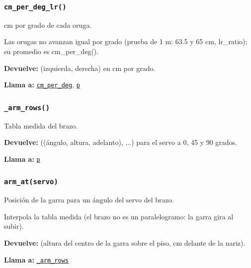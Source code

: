 \subsubsection{\texttt{cm\_\allowbreak{}per\_\allowbreak{}deg\_\allowbreak{}lr()}}\label{fn:geometry:cm-per-deg-lr}
\noindent cm por grado de cada oruga.

Las orugas no avanzan igual por grado (prueba de 1 m: 63.5 y 65 cm, lr\_ratio); su promedio es cm\_per\_deg().

\noindent\textbf{Devuelve:} (izquierda, derecha) en cm por grado.\par
\noindent\textbf{Llama a:} \hyperref[fn:geometry:cm-per-deg]{\texttt{cm\_\allowbreak{}per\_\allowbreak{}deg}}, \hyperref[fn:geometry:p]{\texttt{p}}\par

\subsubsection{\texttt{\_\allowbreak{}arm\_\allowbreak{}rows()}}\label{fn:geometry:-arm-rows}
\noindent Tabla medida del brazo.

\noindent\textbf{Devuelve:} ((ángulo, altura, adelanto), ...) para el servo a 0, 45 y 90 grados.\par
\noindent\textbf{Llama a:} \hyperref[fn:geometry:p]{\texttt{p}}\par

\subsubsection{\texttt{arm\_\allowbreak{}at(servo)}}\label{fn:geometry:arm-at}
\noindent Posición de la garra para un ángulo del servo del brazo.

Interpola la tabla medida (el brazo no es un paralelogramo: la garra gira al subir).

\par{}\par\smallskip
\noindent\textbf{Devuelve:} (altura del centro de la garra sobre el piso, cm delante de la nariz).\par
\noindent\textbf{Llama a:} \hyperref[fn:geometry:-arm-rows]{\texttt{\_\allowbreak{}arm\_\allowbreak{}rows}}\par

